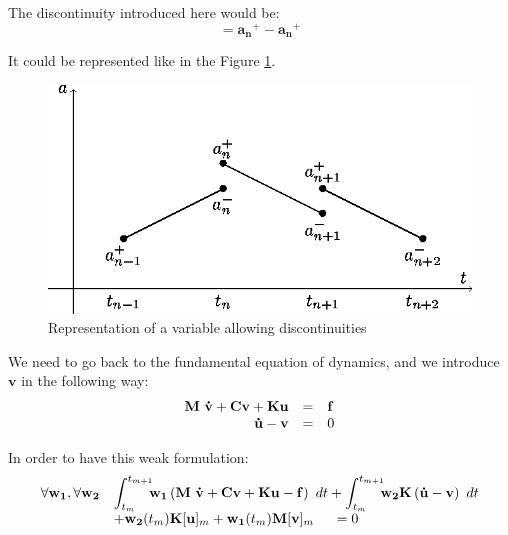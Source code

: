 \documentclass[12pt,a4paper]{article}
\begin{document}
The discontinuity introduced here would be:
\begin{equation}
		 [\mathbf{a_n}] = \mathbf{a_n}^+ - \mathbf{a_n}^+
\end{equation}

It could be represented like in the Figure \ref{GalerkinDiscontinuities}.

\begin{figure}[!ht]
\centering
\includegraphics[width=0.425\linewidth]{Images/Courbe.Galerkin.DIY.eps}
\caption{Representation of a variable allowing discontinuities\label{GalerkinDiscontinuities}}
\end{figure}

We need to go back to the fundamental equation of dynamics, and we introduce $\mathbf{v}$ in the following way:
\begin{equation}
\begin{array}{r c l}
		\mathbf{M}~\mathbf{\dot{v}} 
			+ \mathbf{C}\mathbf{v} 
			+ \mathbf{K}\mathbf{u}
			&=& \mathbf{f}
		\\
		\mathbf{\dot{u}} - \mathbf{v} 
		&=& 0
\end{array}
\end{equation}

In order to have this weak formulation:
\begin{equation}
\begin{array}{r l}
	\forall \mathbf{w_1},\forall \mathbf{w_2}
	&\displaystyle\int_{t_m}^{t_{m+1}} \!\!\! 	\mathbf{w_1}
		\left(
		\mathbf{M}~\mathbf{\dot{v}} 
			+ \mathbf{C}\mathbf{v} 
			+ \mathbf{K}\mathbf{u}
			- \mathbf{f}
		\right)~dt
	  +\displaystyle\int_{t_m}^{t_{m+1}} \!\!\! 	\mathbf{w_2}
		\mathbf{K} 
			\left( \mathbf{\dot{u}} - \mathbf{v} 
			\right) ~dt
	\\
	  &+ \mathbf{w_2}(t_m) \mathbf{K}[\mathbf{u}]_m
	   +  \mathbf{w_1}(t_m) \mathbf{M}[\mathbf{v}]_m
	~~~~=0
\end{array}
\end{equation}
\end{document}
